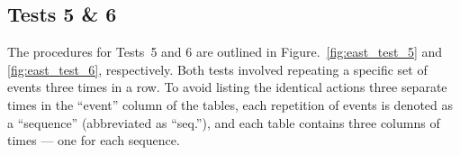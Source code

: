 \subsection{Tests 5 \& 6}

The procedures for Tests~5 and 6 are outlined in Figure.~\ref{fig:east_test_5} and \ref{fig:east_test_6}, respectively. Both tests involved repeating a specific set of events three times in a row. To avoid listing the identical actions three separate times in the ``event'' column of the tables, each repetition of events is denoted as a ``sequence'' (abbreviated as ``seq.''), and each table contains three columns of times --- one for each sequence.


